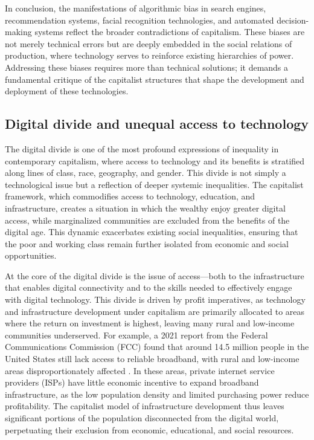 In conclusion, the manifestations of algorithmic bias in search engines, recommendation systems, facial recognition technologies, and automated decision-making systems reflect the broader contradictions of capitalism. These biases are not merely technical errors but are deeply embedded in the social relations of production, where technology serves to reinforce existing hierarchies of power. Addressing these biases requires more than technical solutions; it demands a fundamental critique of the capitalist structures that shape the development and deployment of these technologies.

\subsection{Digital divide and unequal access to technology}

The digital divide is one of the most profound expressions of inequality in contemporary capitalism, where access to technology and its benefits is stratified along lines of class, race, geography, and gender. This divide is not simply a technological issue but a reflection of deeper systemic inequalities. The capitalist framework, which commodifies access to technology, education, and infrastructure, creates a situation in which the wealthy enjoy greater digital access, while marginalized communities are excluded from the benefits of the digital age. This dynamic exacerbates existing social inequalities, ensuring that the poor and working class remain further isolated from economic and social opportunities.

At the core of the digital divide is the issue of access—both to the infrastructure that enables digital connectivity and to the skills needed to effectively engage with digital technology. This divide is driven by profit imperatives, as technology and infrastructure development under capitalism are primarily allocated to areas where the return on investment is highest, leaving many rural and low-income communities underserved. For example, a 2021 report from the Federal Communications Commission (FCC) found that around 14.5 million people in the United States still lack access to reliable broadband, with rural and low-income areas disproportionately affected \cite[pp.~23-25]{fcc2021}. In these areas, private internet service providers (ISPs) have little economic incentive to expand broadband infrastructure, as the low population density and limited purchasing power reduce profitability. The capitalist model of infrastructure development thus leaves significant portions of the population disconnected from the digital world, perpetuating their exclusion from economic, educational, and social resources.

